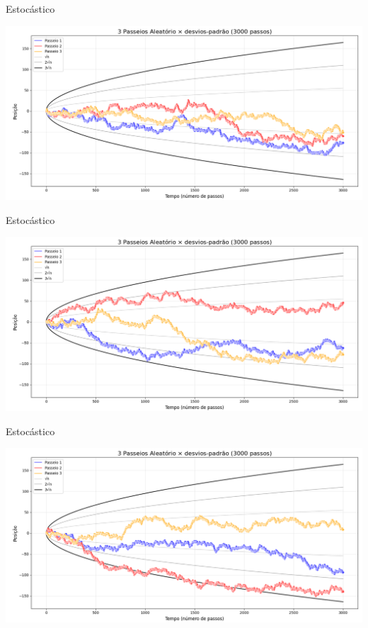 \documentclass{beamer}
\begin{document}
\begin{frame}{Estocástico}

\includegraphics[width=\textwidth]{srw3.png}

\end{frame}

\begin{frame}{Estocástico}

\includegraphics[width=\textwidth]{srw4.png}

\end{frame}

\begin{frame}{Estocástico}

\includegraphics[width=\textwidth]{srw5.png}

\end{frame}
\end{document}
